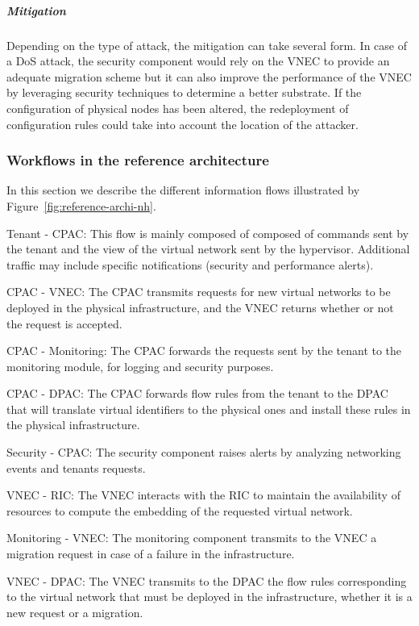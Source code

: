 \subparagraph{Mitigation}
Depending on the type of attack, the mitigation can take several form. 
In case of a DoS attack, the security component would rely on the VNEC to provide an adequate migration scheme but it can also improve the performance of the VNEC by leveraging security techniques to determine a better substrate. 
If the configuration of physical nodes has been altered, the redeployment of configuration rules could take into account the location of the attacker.

\subsubsection{Workflows in the reference architecture}
In this section we describe the different information flows illustrated by Figure~\ref{fig:reference-archi-nh}.

 Tenant - CPAC: This flow is mainly composed of composed of commands sent by the tenant and the view of the virtual network sent by the hypervisor. Additional traffic may include specific notifications (\eg security and performance alerts).

 CPAC - VNEC: The CPAC transmits requests for new virtual networks to be deployed in the physical infrastructure, and the VNEC returns whether or not the request is accepted.

 CPAC - Monitoring: The CPAC forwards the requests sent by the tenant to the monitoring module, for logging and security purposes. 

 CPAC - DPAC: The CPAC forwards flow rules from the tenant to the DPAC that will translate virtual identifiers to the physical ones and install these rules in the physical infrastructure.

 Security - CPAC: The security component raises alerts by analyzing networking events and tenants requests.

 VNEC - RIC: The VNEC interacts with the RIC to maintain the availability of resources to compute the embedding of the requested virtual network.

 Monitoring - VNEC: The monitoring component transmits to the VNEC a migration request in case of a failure in the infrastructure.

 VNEC - DPAC: The VNEC transmits to the DPAC the flow rules corresponding to the virtual network that must be deployed in the infrastructure, whether it is a new request or a migration.

